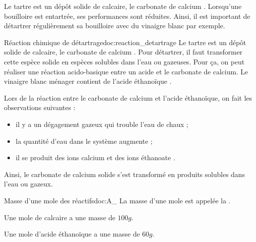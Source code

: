 \teteSndChim
\vspace*{-6pt}
\nomPrenomClasse



\begin{contexte}
  Le tartre est un dépôt solide de calcaire, le carbonate de calcium .
  Lorsqu'une bouilloire est entartrée, ses performances sont réduites.
  Ainsi, il est important de détartrer régulièrement sa bouilloire avec du vinaigre blanc par exemple.
  
\end{contexte}


\begin{doc}{Réaction chimique de détartrage}{doc:reaction_detartrage}
  Le tartre est un dépôt solide de calcaire, le carbonate de calcium .
  Pour détartrer, il faut transformer cette espèce solide en espèces solubles dans l'eau ou gazeuses.
  Pour ça, on peut réaliser une réaction acido-basique entre un acide et le carbonate de calcium.
  Le vinaigre blanc ménager contient de l'acide éthanoïque .

  Lors de la réaction entre le carbonate de calcium et l'acide éthanoïque, on fait les observations suivantes :
  \begin{itemize}
    \item il y a un dégagement gazeux qui trouble l'eau de chaux ;
    \item la quantité d'eau dans le système augmente ;
    \item il se produit des ions calcium  et des ions éthanoate .
  \end{itemize}
    
  Ainsi, le carbonate de calcium solide s'est transformé en produits solubles dans l'eau ou gazeux.
\end{doc}

\begin{doc}{Masse d'une mole des réactifs}{doc:A_}
  La masse d'une mole est appelée la .

  \begin{donnees}
    \item Une mole de calcaire  a une masse de $100 \unit{g}$.
    \item Une mole d'acide éthanoïque  a une masse de $60 \unit{g}$.
  \end{donnees}
\end{doc}

